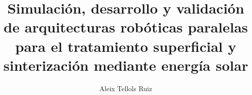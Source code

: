 
\title{Simulación, desarrollo y validación de arquitecturas robóticas paralelas para el tratamiento superficial y sinterización mediante energía solar}
\author{Aleix Tellols Ruiz}










\address{UCLM --- Escuela de Ingeniería Industrial y Aeroespacial\\
    Campus Universitario de la Real Fábrica de Armas}
